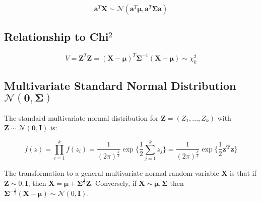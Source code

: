 \begin{equation}
\mathbf{a}^T \mathbf{X} \sim \mathscr{N}(\mathbf{a}^T \mathbf{\mu}, \mathbf{a}^T\mathbf{\Sigma}\mathbf{a})
\end{equation}


\subsection{Relationship to Chi$^2$}
\begin{equation}
V = \mathbf{Z}^T\mathbf{Z} = (\mathbf{X}-\mathbf{\mu})^T\mathbf{\Sigma}^{-1}(\mathbf{X}-\mathbf{\mu}) \sim \chi^2_k
\end{equation}

\subsection{Multivariate Standard Normal Distribution $\mathscr{N}(\mathbf{0},\mathbf{\Sigma})$}
The standard multivariate normal distribution for $\mathbf{Z} = (Z_1,...,Z_k)$ with $\mathbf{Z} \sim \mathscr{N}(\mathbf{0},\mathbf{I})$ is:

\begin{equation}
f(z) = \prod^k_{i=1} f(z_i) = \frac{1}{(2\pi)^{\frac{k}{2}}}\exp \{ \frac{1}{2} \sum^{k}_{j=1} z_j\} = \frac{1}{(2\pi)^{\frac{k}{2}}}\exp \{ \frac{1}{2} \mathbf{z^T z}\}
\end{equation}

The transformation to a general multivariate normal random variable $\mathbf{X}$ is that if $\mathbf{Z} \sim \mathscr{0,\mathbf{I}}$, then $\mathbf{X} = \mathbf{\mu} + \mathbf{\Sigma}^{\frac{1}{2}}\mathbf{Z}$. Conversely, if $\mathbf{X}\sim \mathscr{\mathbf{\mu},\mathbf{\Sigma}}$ then $\mathbf{\Sigma}^{-\frac{1}{2}}(\mathbf{X}-\mathbf{\mu}) \sim \mathscr{N}(0,\mathbf{I})$.
